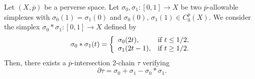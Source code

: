 \documentclass[10pt,a4paper]{amsart}
\def\ov{\overline}
\begin{document}
\begin{lemma}\label{*tau}
%
Let $(X,\ov p)$ be a perverse space.  
Let $\sigma_0, \sigma_1 \colon[0,1] \to X$ be two $\ov p$-allowable simplexes  with $\sigma_0(1) = \sigma_1(0)$
and $\sigma_{0}(0),\,\sigma_{1}(1)\in C_0^{\ov p}(X)$. 
We consider the simplex  $\sigma_0 * \sigma_1 \colon [0,1] \to X$ defined by 
 $$
    \sigma_0 * \sigma_1(t) = \left\{
    \begin{array}{ll}
    \sigma_0(2t) ,& \hbox{if } t\leq 1/2,\\
      \sigma_1(2t-1) ,& \hbox{if } t\geq 1/2.
      \end{array}
      \right.
      $$
Then, 
there exists a $\ov p$-intersection 2-chain  $\tau$ verifying 
\begin{equation}\label{sigma*}
\partial \tau =     \sigma_0 + \sigma_1 - \sigma_0*\sigma_1.
\end{equation}
\end{lemma}
\end{document}
